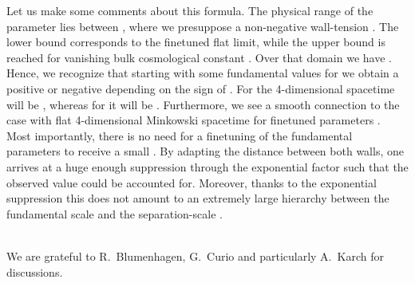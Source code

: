 \documentclass[a4paper,12pt]{article}
\begin{document}
Let us make some comments about this formula. The physical range of
the parameter \coordHE{} lies between \coordHE{}, where we presuppose a
non-negative wall-tension \coordHE{}. The lower bound corresponds to the
finetuned flat \coordHE{} limit, while the upper bound is reached
for vanishing bulk cosmological constant \coordHE{}. Over that
domain we have \coordHE{}. Hence, we recognize that starting with some
fundamental values for \coordHE{} we obtain a positive or
negative \coordHE{} depending on the sign of \coordHE{}. For
\coordHE{} the 4-dimensional spacetime will be
\coordHE{}, whereas for \coordHE{} it will be
\coordHE{}. Furthermore, we see a smooth connection to the case
with flat 4-dimensional Minkowski spacetime for finetuned parameters
\coordHE{}.  Most importantly,
there is no need for a finetuning of the fundamental parameters to
receive a small \coordHE{}. By adapting the distance \coordHE{} between
both walls, one arrives at a huge enough suppression through the
exponential factor such that the observed value could be accounted
for. Moreover, thanks to the exponential suppression this does not
amount to an extremely large hierarchy between the fundamental scale
\coordHE{} and the separation-scale \coordHE{}.


\bigskip
{}\\[2ex] 
We are grateful to R.~Blumenhagen, G.~Curio and particularly A.~Karch for
discussions.
\end{document}

